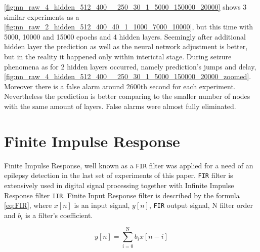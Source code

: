 \figurename{} \ref{fig:nn_raw_4_hidden_512_400__250_30_1_5000_150000_20000} shows 3 similar experiments as a \figurename{} \ref{fig:nn_raw_2_hidden_512_400_40_1_1000_7000_10000}, but this time with 5000, 10000 and 15000 epochs and 4 hidden layers. Seemingly after additional hidden layer the prediction as well as the neural network adjustment is better, but in the reality it happened only within interictal stage. During seizure phenomena as for 2 hidden layers occurred, namely prediction's jumps and delay, \figurename{} \ref{fig:nn_raw_4_hidden_512_400__250_30_1_5000_150000_20000_zoomed}. Moreover there is a false alarm around 2600th second for each experiment. 
Nevertheless the prediction is better comparing to the smaller number of nodes with the same amount of layers. False alarms were almost fully eliminated.
\section{Finite Impulse Response}
Finite Impulse Response, well known as a \verb|FIR| filter was applied for a need of an epilepsy detection in the last set of experiments of this paper. \verb|FIR| filter is extensively used in digital signal processing together with Infinite Impulse Response filter \verb|IIR|. Finite Input Response filter is described by the formula \ref{eq:FIR}, where $x[n]$ is an input signal, $y[n]$, \verb|FIR| output signal, N filter order and $b_i$ is a filter's coefficient.

\begin{equation} \label{eq:FIR}
y[n]=\sum_{i=0}^{\mathrm{N}} b_i x[n-i]
\end{equation}

